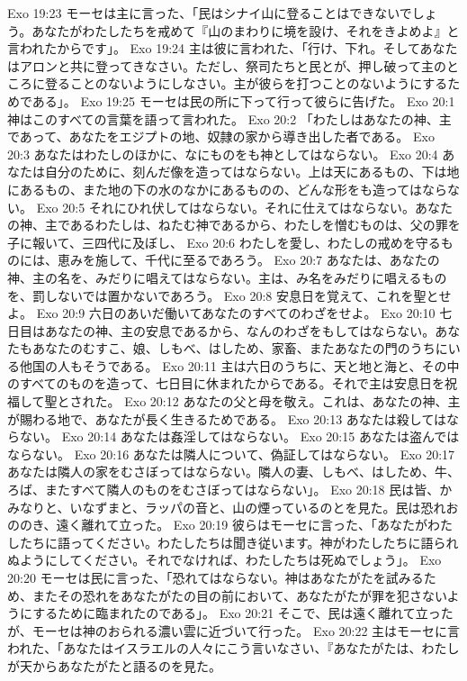 Exo 19:23  モーセは主に言った、「民はシナイ山に登ることはできないでしょう。あなたがわたしたちを戒めて『山のまわりに境を設け、それをきよめよ』と言われたからです」。
Exo 19:24  主は彼に言われた、「行け、下れ。そしてあなたはアロンと共に登ってきなさい。ただし、祭司たちと民とが、押し破って主のところに登ることのないようにしなさい。主が彼らを打つことのないようにするためである」。
Exo 19:25  モーセは民の所に下って行って彼らに告げた。
Exo 20:1  神はこのすべての言葉を語って言われた。
Exo 20:2  「わたしはあなたの神、主であって、あなたをエジプトの地、奴隷の家から導き出した者である。
Exo 20:3  あなたはわたしのほかに、なにものをも神としてはならない。
Exo 20:4  あなたは自分のために、刻んだ像を造ってはならない。上は天にあるもの、下は地にあるもの、また地の下の水のなかにあるものの、どんな形をも造ってはならない。
Exo 20:5  それにひれ伏してはならない。それに仕えてはならない。あなたの神、主であるわたしは、ねたむ神であるから、わたしを憎むものは、父の罪を子に報いて、三四代に及ぼし、
Exo 20:6  わたしを愛し、わたしの戒めを守るものには、恵みを施して、千代に至るであろう。
Exo 20:7  あなたは、あなたの神、主の名を、みだりに唱えてはならない。主は、み名をみだりに唱えるものを、罰しないでは置かないであろう。
Exo 20:8  安息日を覚えて、これを聖とせよ。
Exo 20:9  六日のあいだ働いてあなたのすべてのわざをせよ。
Exo 20:10  七日目はあなたの神、主の安息であるから、なんのわざをもしてはならない。あなたもあなたのむすこ、娘、しもべ、はしため、家畜、またあなたの門のうちにいる他国の人もそうである。
Exo 20:11  主は六日のうちに、天と地と海と、その中のすべてのものを造って、七日目に休まれたからである。それで主は安息日を祝福して聖とされた。
Exo 20:12  あなたの父と母を敬え。これは、あなたの神、主が賜わる地で、あなたが長く生きるためである。
Exo 20:13  あなたは殺してはならない。
Exo 20:14  あなたは姦淫してはならない。
Exo 20:15  あなたは盗んではならない。
Exo 20:16  あなたは隣人について、偽証してはならない。
Exo 20:17  あなたは隣人の家をむさぼってはならない。隣人の妻、しもべ、はしため、牛、ろば、またすべて隣人のものをむさぼってはならない」。
Exo 20:18  民は皆、かみなりと、いなずまと、ラッパの音と、山の煙っているのとを見た。民は恐れおののき、遠く離れて立った。
Exo 20:19  彼らはモーセに言った、「あなたがわたしたちに語ってください。わたしたちは聞き従います。神がわたしたちに語られぬようにしてください。それでなければ、わたしたちは死ぬでしょう」。
Exo 20:20  モーセは民に言った、「恐れてはならない。神はあなたがたを試みるため、またその恐れをあなたがたの目の前において、あなたがたが罪を犯さないようにするために臨まれたのである」。
Exo 20:21  そこで、民は遠く離れて立ったが、モーセは神のおられる濃い雲に近づいて行った。
Exo 20:22  主はモーセに言われた、「あなたはイスラエルの人々にこう言いなさい、『あなたがたは、わたしが天からあなたがたと語るのを見た。
